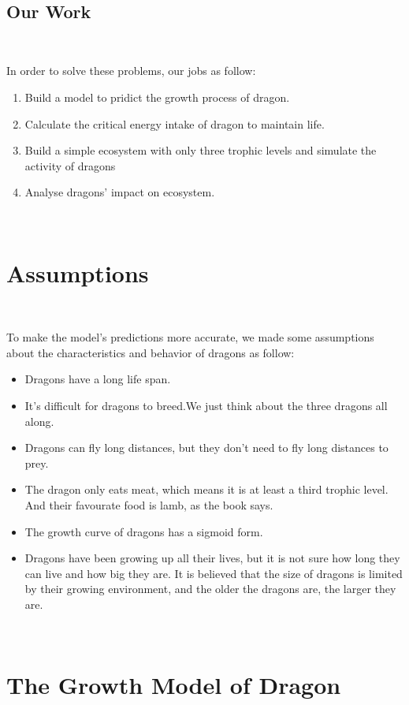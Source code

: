 \documentclass{mcmthesis}
\begin{document}
~\ \
\subsection{Our Work}
~\ \

In order to solve these problems, our jobs as follow:

\begin{enumerate}[\bfseries 1.]
    \item Build a model to pridict the growth process of dragon.
    \item Calculate the critical energy intake of dragon to maintain life.
    \item Build a simple ecosystem with only three trophic levels and simulate the activity of dragons
    \item Analyse dragons' impact on ecosystem.
\end{enumerate}

~\ \
\section{Assumptions}
~\ \

To make the model's predictions more accurate, 
we made some assumptions about the characteristics and behavior of dragons as follow:

\begin{itemize}
    \item Dragons have a long life span.
    \item It's difficult for dragons to breed.We just think about the three dragons all along.
    \item Dragons can fly long distances, but they don't need to fly long distances to prey.
    \item The dragon only eats meat, which means it is at least a third trophic level. And their favourate food is lamb, as the book says.
    \item The growth curve of dragons has a sigmoid form.
    \item Dragons have been growing up all their lives, but it is not sure how long they can live and how big they are. It is believed that the size of dragons is limited by their growing environment, and the older the dragons are, the larger they are.
\end{itemize}

~\ \
\section{The Growth Model of Dragon}
~\ \
\end{document}
